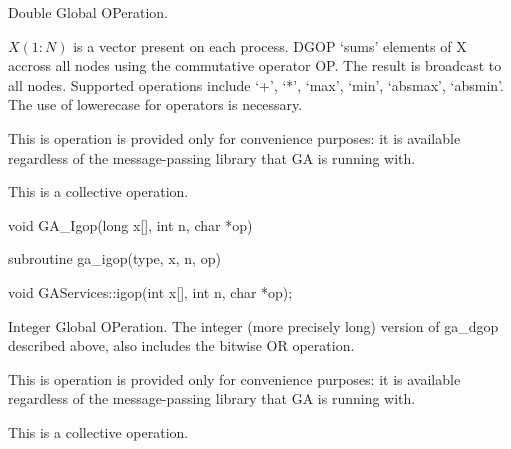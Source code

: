 \documentclass[12pt]{article}
\begin{document}
\begin{desc}

Double Global OPeration.

$X(1:N)$ is a vector present on each process. DGOP `sums' elements of 
X accross all nodes using the commutative operator OP. The result is 
broadcast to all nodes. Supported operations include `+', `*', `max', 
`min', `absmax', `absmin'. The use of lowerecase for operators is necessary.

This is operation is provided only for convenience purposes: it is available 
regardless of the message-passing library that GA is running with.

This is a collective operation.
\end{desc}


\begin{capi}
\begin{ccode}
void GA_Igop(long x[], int n, char *op)
\end{ccode}
\begin{funcargs}
\end{funcargs}
\end{capi}

\begin{fapi}
\begin{fcode}
subroutine ga_igop(type, x, n, op)
\end{fcode}
\begin{funcargs}
\end{funcargs}
\end{fapi}

\begin{cxxapi}
\begin{cxxcode}
void GAServices::igop(int x[], int n, char *op);
\end{cxxcode}
\begin{funcargs}
\end{funcargs}
\end{cxxapi}

\begin{desc}

Integer Global OPeration. The integer (more precisely long) version
of ga_dgop described above, also includes the bitwise OR operation.

This is operation is provided only for convenience purposes: it is 
available regardless of the message-passing library that GA is running with.

This is a collective operation.
\end{desc}
\end{document}
